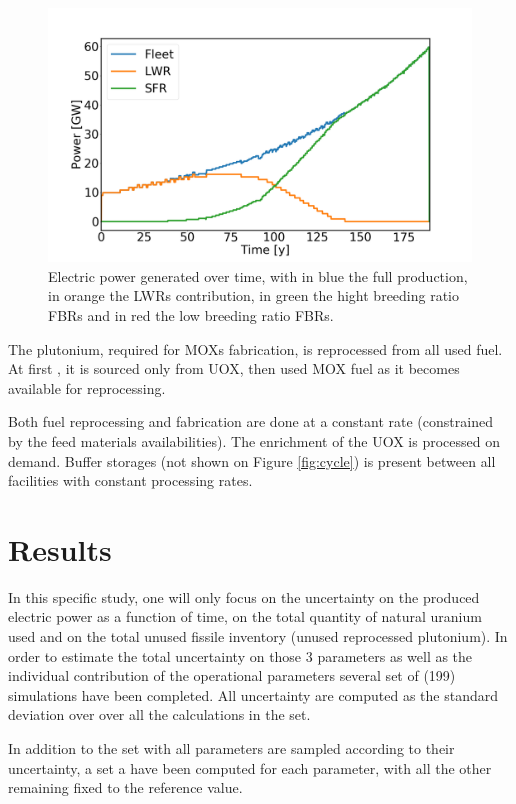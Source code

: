\documentclass{anstrans}
\begin{document}
\begin{figure}[ht] %
    \centering
    \includegraphics[scale=0.18]{power.png}
    \caption{Electric power generated over time, with in blue the full production,
        in orange the \glspl{LWR} contribution, in green the hight breeding ratio
        \glspl{FBR} and in red the low breeding ratio \glspl{FBR}.}\label{fig:power}
\end{figure}


The plutonium, required for \glspl{MOX} fabrication, is reprocessed from all
used fuel. At first , it is sourced only from UOX, then used MOX fuel as it becomes
available for reprocessing.

Both fuel reprocessing and fabrication are done at a constant rate (constrained
by the feed materials availabilities). The enrichment of the UOX is processed on
demand. Buffer storages (not shown on Figure \ref{fig:cycle}) is present between
all facilities with constant processing rates.


\section{Results}
In this specific study, one will only focus on the uncertainty on the produced
electric power as a function of time, on the total quantity of natural uranium
used and on the total unused fissile inventory (unused reprocessed plutonium).
In order to estimate the total uncertainty on those 3 parameters as well as the
individual contribution of the operational parameters several set of (199)
simulations have been completed.  All uncertainty are computed as the standard
deviation over over all the calculations in the set.

In addition to the set with all parameters are sampled according to their
uncertainty, a set a have been computed for each parameter, with all the other
remaining fixed to the reference value.
\end{document}
